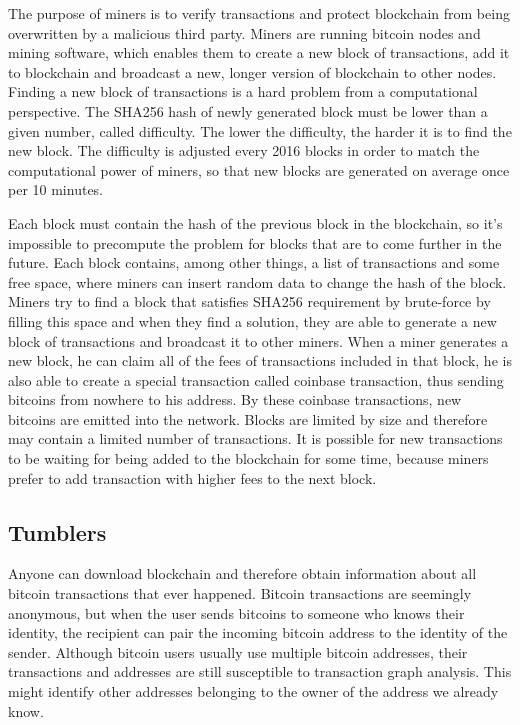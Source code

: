 \documentclass[
  digital, %
  table,   %
  lof,     %
  lot,     %
  oneside
]{fithesis3}
\begin{document}
The purpose of miners is to verify transactions and protect blockchain
from being overwritten by a malicious third party.
Miners are running bitcoin nodes and mining software,
which enables them to create a new block of transactions,
add it to blockchain and broadcast a new, longer version of blockchain to other nodes.
Finding a new block of transactions is a hard problem from a computational perspective.
The SHA256 hash of newly generated block must be lower than a given number, called difficulty.
The lower the difficulty, the harder it is to find the new block.
The difficulty is adjusted every 2016 blocks in order to match the computational power of miners,
so that new blocks are generated on average once per 10 minutes.

Each block must contain the hash of the previous block in the blockchain, so it's impossible
to precompute the problem for blocks that are to come further in the future. 
Each block contains, among other things, a list of transactions and some free space,
where miners can insert random data to change the hash of the block.
Miners try to find a block that satisfies SHA256 requirement
by brute-force by filling this space and when they find a solution,
they are able to generate a new block of transactions and broadcast it to other miners.
When a miner generates a new block, he can claim all of the fees of transactions included in that block,
he is also able to create a special transaction called coinbase transaction, thus sending bitcoins from
nowhere to his address. By these coinbase transactions, new bitcoins are emitted into the network.
Blocks are limited by size and therefore may contain a limited number of transactions.
It is possible for new transactions to be waiting for being added to the blockchain for some time,
because miners prefer to add transaction with higher fees to the next block.

\subsection{Tumblers}
Anyone can download blockchain and therefore obtain information about all bitcoin transactions that ever happened.
Bitcoin transactions are seemingly anonymous, but when the user sends bitcoins to
someone who knows their identity, the recipient can pair the incoming bitcoin address
to the identity of the sender.
Although bitcoin users usually use multiple bitcoin addresses,
their transactions and addresses are still 
susceptible to transaction graph analysis.
This might identify other addresses belonging to the owner of the address we already know.
\end{document}
